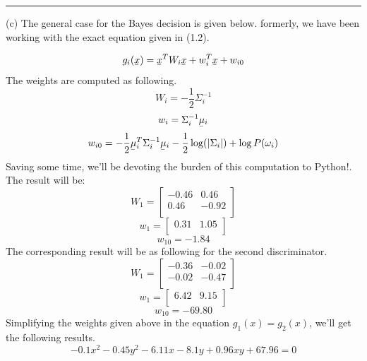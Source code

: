 \documentclass[12pt]{article}
\numberwithin{equation}{section}
\numberwithin{table}{section}
\numberwithin{figure}{section}
\begin{document}
\noindent\rule{\textwidth}{.5pt}
(c) The general case for the Bayes decision is given below. formerly, we have been working with the exact equation given in (1.2).

\begin{equation}
	g_i(\underaccent{\bar}{x}) = \underaccent{\bar}{x}^TW_i\underaccent{\bar}{x} + w_i^T\underaccent{\bar}{x} + w_{i0}
\end{equation}
The weights are computed as following.
$$
	W_i = -\frac{1}{2}\Sigma_i^{-1}
$$
$$
	w_i = \Sigma_i^{-1}\underaccent{\bar}{\mu}_i
$$
$$
	w_{i0} = -\frac{1}{2}\underaccent{\bar}{\mu}_i^T\Sigma_i^{-1}\underaccent{\bar}{\mu}_i - \frac{1}{2}\log(|\Sigma_i|) + \log P(\omega_i)
$$
Saving some time, we'll be devoting the burden of this computation to Python!. The result will be:
$$
	W_1 =  \begin{bmatrix}
	-0.46 & 0.46\\
	0.46 & -0.92\\
	\end{bmatrix}
$$
$$
	w_1 = \begin{bmatrix}
	0.31 & 1.05\\
	\end{bmatrix}
$$
$$
	w_{10} = -1.84
$$
The corresponding result will be as following for the second discriminator.
$$
	W_1 =  \begin{bmatrix}
	-0.36 & -0.02\\
	-0.02 & -0.47\\
	\end{bmatrix}
$$
$$
	w_1 = \begin{bmatrix}
	6.42 & 9.15\\
	\end{bmatrix}
$$
$$
	w_{10} = -69.80
$$
Simplifying the weights given above in the equation $g_1(x) = g_2(x)$, we'll get the following results.
$$
	-0.1x^2 - 0.45y^2 - 6.11x - 8.1y + 0.96xy + 67.96= 0
$$
	
	
\end{document}
